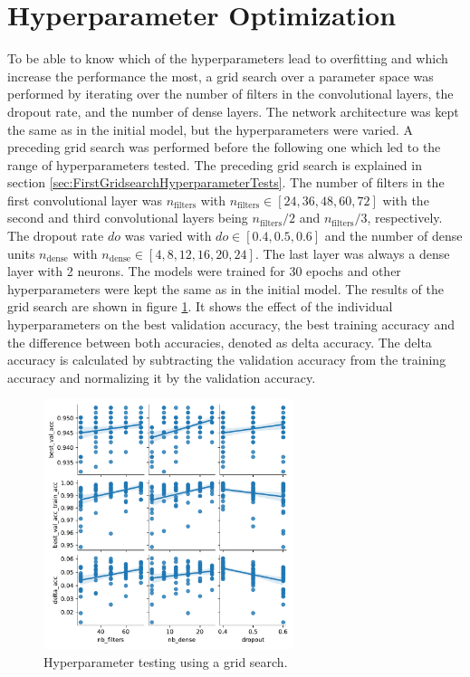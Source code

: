 \section{Hyperparameter Optimization}
\label{sec:hyperparameter}

To be able to know which of the hyperparameters lead to overfitting and which increase the performance the most, a grid search \cite{gridsearch} over a parameter space was performed by iterating over the number of filters in the convolutional layers, the dropout rate, and the number of dense layers.
The network architecture was kept the same as in the initial model, but the hyperparameters were varied. 
A preceding grid search was performed before the following one which led to the range of hyperparameters tested.
The preceding grid search is explained in section \ref{sec:FirstGridsearchHyperparameterTests}.
The number of filters in the first convolutional layer was $n_{\text{filters}}$ with $n_{\text{filters}} \in [24, 36, 48, 60, 72]$ with the second and third convolutional layers being $n_{\text{filters}}/2$ and $n_{\text{filters}}/3$, respectively.
The dropout rate $do$ was varied with $do \in [0.4, 0.5, 0.6]$ and the number of dense units $n_{\text{dense}}$ with $n_{\text{dense}} \in [4, 8, 12, 16, 20, 24]$.
The last layer was always a dense layer with 2 neurons.
The models were trained for 30 epochs and other hyperparameters were kept the same as in the initial model. \newline
The results of the grid search are shown in figure \ref{fig:gridsearch}.
It shows the effect of the individual hyperparameters on the best validation accuracy, the best training accuracy and the difference between both accuracies, denoted as delta accuracy.
The delta accuracy is calculated by subtracting the validation accuracy from the training accuracy and normalizing it by the validation accuracy.
\begin{figure}[H]
    \centering
    \includegraphics[width=0.65\textwidth]{plots/pairplot.pdf}
    \caption{Hyperparameter testing using a grid search.}
    \label{fig:gridsearch}
\end{figure}


